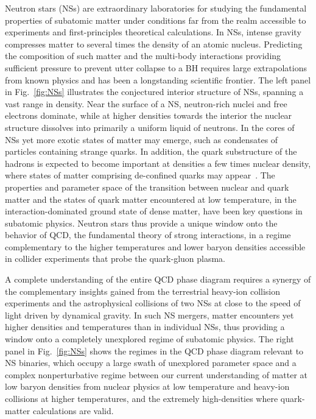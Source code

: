 Neutron stars (NSs) are extraordinary laboratories for studying the fundamental properties of subatomic matter under conditions far from the realm accessible to experiments and first-principles theoretical calculations. In NSs, intense gravity compresses matter to several times the density of an atomic nucleus. Predicting the composition of such matter and the multi-body interactions providing sufficient pressure to prevent utter collapse to a BH requires large extrapolations from known physics and has been a longstanding scientific frontier. The left panel in Fig.~\ref{fig:NSs} illustrates the conjectured interior structure of NSs, spanning a vast range in density. Near the surface of a NS, neutron-rich nuclei and free electrons dominate, while at higher densities towards the interior the nuclear structure dissolves into primarily a uniform liquid of neutrons. In the cores of NSs yet more exotic states of matter may emerge, such as condensates of particles containing strange quarks. In addition, the quark substructure of the hadrons is expected to become important at densities a few times nuclear density, where states of matter comprising de-confined quarks may appear~\cite{Baym:2017whm}. The properties and parameter space of the transition between nuclear and quark matter and the states of quark matter encountered at low temperature, in the interaction-dominated ground state of dense matter, have been key questions in subatomic physics. Neutron stars thus provide a unique window onto the behavior of QCD, the fundamental theory of strong interactions, in a regime complementary to the higher temperatures and lower baryon densities accessible in collider experiments that probe the quark-gluon plasma. 

A complete understanding of the entire QCD phase diagram requires a synergy of the complementary insights gained from the terrestrial heavy-ion collision experiments and the astrophysical collisions of two NSs at close to the speed of light driven by dynamical gravity. In such NS mergers, matter encounters yet higher densities and temperatures than in individual NSs, thus providing a window onto a completely unexplored regime of subatomic physics. The right panel in Fig.~\ref{fig:NSs} shows the regimes in the QCD phase diagram relevant to NS binaries, which occupy a large swath of unexplored parameter space and a complex nonperturbative regime between our current understanding of matter at low baryon densities from nuclear physics at low temperature and heavy-ion collisions at higher temperatures, and the extremely high-densities where quark-matter calculations are valid. 

